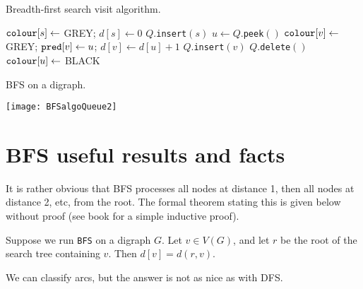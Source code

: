 \begin{algorithm}[H]
  \caption{Breadth-first search visit algorithm.}
     \label{alg:BFSvisitcode}
  \begin{algorithmic}[1]
	\State $\operatorname{\text{\texttt{colour}}}[s] \gets $ GREY; $d[s] \gets 0$ 
	\State $Q$.\texttt{insert}$(s)$
		\State $u \gets Q$.\texttt{peek}$()$
				\State $\operatorname{\text{\texttt{colour}}}[v] \gets $ GREY; $\operatorname{\text{\texttt{pred}}}[v] \gets u$; $d[v] \gets d[u]+1$
				\State $Q$.\texttt{insert}$(v)$
			\EndIf
		\EndFor
		\State $Q$.\texttt{delete}$()$
		\State $\operatorname{\text{\texttt{colour}}}[u] \gets $ BLACK
	\EndWhile
\EndFunction
\end{algorithmic}
\end{algorithm}

\begin{Boxample}
BFS on a digraph.
\begin{center}
  \texttt{[image: BFSalgoQueue2]}
\end{center}
\end{Boxample}

\section{BFS useful results and facts} 
It is rather obvious that BFS processes all nodes at distance 1, then
all nodes at distance 2, etc, from the root. 
The formal theorem stating this is given below without proof (see book for a simple inductive proof).

\begin{Theorem} \label{thm:BFSdist}
Suppose we run \texttt{BFS} on a digraph $G$.
Let $v \in V(G)$, and let $r$ be the root of the search tree containing $v$. 
Then $d[v] = d(r, v)$.
\end{Theorem}

We can classify arcs, but the answer is not as nice as with DFS.

